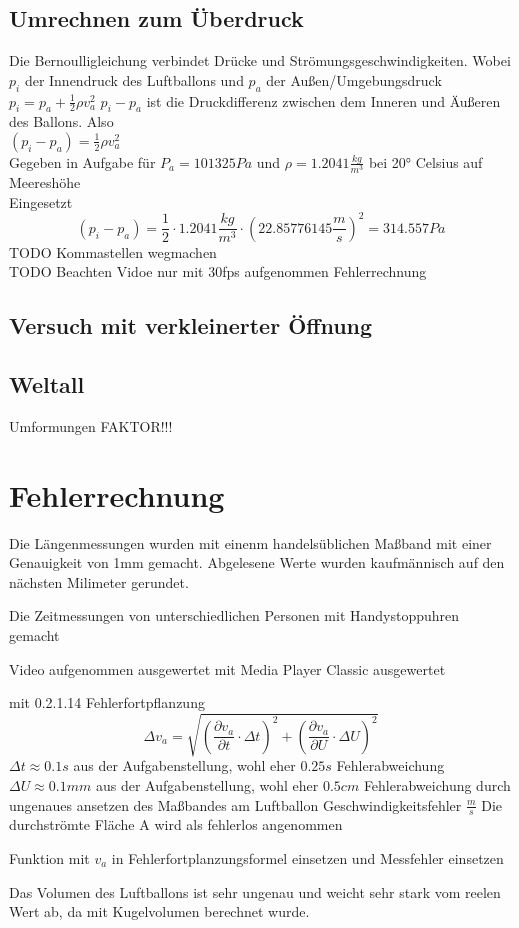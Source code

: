 \documentclass{article}
\begin{document}
    \subsection{Umrechnen zum Überdruck}
    Die Bernoulligleichung verbindet Drücke und Strömungsgeschwindigkeiten. 
    Wobei \(p_i\) der Innendruck des Luftballons und \(p_a\) der Außen/Umgebungsdruck\\
    \(p_i = p_a + \frac{1}{2} \rho v_a^2\)
    \(p_i - p_a\) ist die Druckdifferenz zwischen dem Inneren und Äußeren des Ballons. Also \\
    \( (p_i - p_a) = \frac{1}{2} \rho v_a^2 \) \\
    Gegeben in Aufgabe für \( P_a = 101 325 Pa\) und \(\rho = 1.2041 \frac{kg}{m^3} \) bei 20° Celsius auf Meereshöhe \\
    Eingesetzt
    \[ (p_i - p_a) = \frac{1}{2} \cdot 1.2041 \frac{kg}{m^3} \cdot {(22.85776145 \frac{m}{s})}^2 = 314.557 Pa \]
    TODO Kommastellen wegmachen \\
    TODO Beachten Vidoe nur mit 30fps aufgenommen Fehlerrechnung
    \subsection{Versuch mit verkleinerter Öffnung}

    \subsection{Weltall}
    Umformungen
    FAKTOR!!!

    \section{Fehlerrechnung}
    Die Längenmessungen wurden mit einenm handelsüblichen Maßband mit einer
    Genauigkeit von 1mm gemacht. Abgelesene Werte wurden kaufmännisch auf den
    nächsten Milimeter gerundet.

    Die Zeitmessungen von unterschiedlichen Personen mit Handystoppuhren gemacht

    Video aufgenommen ausgewertet mit Media Player Classic ausgewertet

    mit 0.2.1.14 Fehlerfortpflanzung \\
    \[ \Delta v_a = \sqrt{ {\left( \frac{ \partial v_a }{ \partial t } \cdot \Delta t \right)}^2 + {\left( \frac{ \partial v_a }{ \partial U } \cdot \Delta U \right)}^2 } \]
    \(\Delta t \approx 0.1s\) aus der Aufgabenstellung, wohl eher \(0.25s\) Fehlerabweichung
    \(\Delta U \approx 0.1mm\) aus der Aufgabenstellung, wohl eher \(0.5cm\) Fehlerabweichung durch ungenaues ansetzen des Maßbandes am Luftballon
    Geschwindigkeitsfehler \( \frac{m}{s}\)
    Die durchströmte Fläche A wird als fehlerlos angenommen

    Funktion mit \(v_a\) in Fehlerfortplanzungsformel einsetzen und Messfehler einsetzen

    Das Volumen des Luftballons ist sehr ungenau und weicht sehr stark vom reelen Wert ab, da mit Kugelvolumen berechnet wurde.
\end{document}
